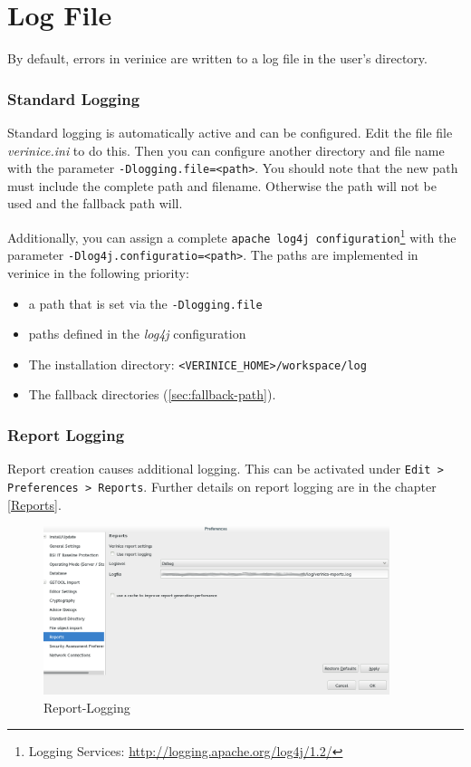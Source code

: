 \documentclass[a4paper,10pt]{book}
\begin{document}
\section{Log File}
\label{sec:log-file}

By default, errors in verinice are written to a log file in the user’s
directory.

\subsubsection{Standard Logging}
\label{sec:standard-logging}

Standard logging is automatically active and can be configured. Edit
the file file \textit{verinice.ini} to do this. Then you can configure
another directory and file name with the parameter
\texttt{-Dlogging.file=<path>}. You should note that the new path must
include the complete path and filename. Otherwise the path will not be
used and the fallback path will.

Additionally, you can assign a complete \texttt{apache log4j
  configuration}\footnote{Logging Services:
  \url{http://logging.apache.org/log4j/1.2/}} with the parameter
\texttt{-Dlog4j.configuratio=<path>}. The paths are implemented in
verinice in the following priority:

\begin{itemize}
\item a path that is set via the \texttt{-Dlogging.file}
\item paths defined in the \textit{log4j} configuration
\item The installation directory:
  \texttt{<VERINICE\_HOME>/workspace/log}
\item The fallback directories (\ref{sec:fallback-path}).
\end{itemize}

\subsubsection{Report Logging}
\label{sec:report-logging}

Report creation causes additional logging.  This can be activated
under \texttt{Edit > Preferences > Reports}. Further details on report
logging are in the chapter \ref{Reports}.

\begin{figure}[ht]
  \centering
  \includegraphics[width=0.9\textwidth]{Screenshot/report-logging.png}
  \caption{Report-Logging}
  \label{fig:report-logging}
\end{figure}
\end{document}
